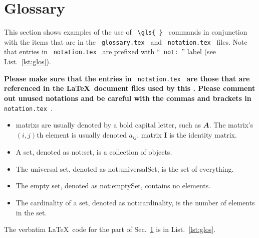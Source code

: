 \newpage
\section{Glossary}
\label{sec:glos}

This section shows examples of the use of \verb| \gls{ } | commands in conjunction with the items that are in the \verb| glossary.tex | and \verb| notation.tex | files.  Note that entries in  \verb| notation.tex |  are prefixed with ``\verb| not: |'' label (see List.~\ref{lst:glos}).

\textbf{Please make sure that the entries in} \verb| notation.tex |\textbf{  are those that are referenced in the \LaTeX \ document files used by this \documentType.  Please comment out unused notations and be careful with the commas and brackets  in} \verb| notation.tex |.

\begin{itemize}

	\item \Glspl{matrix} are usually denoted by a bold capital letter, such as $\mathbfit{A}$. The \gls{matrix}'s $(i,j)$th element is usually denoted $a_{ij}$. \Gls{matrix} $\mathbf{I}$ is the identity \gls{matrix}.

	\item A set, denoted as \gls{not:set}, is a collection of objects.

	\item The universal set,  denoted as \gls{not:universalSet}, is the set of everything.

	\item The empty set, denoted as \gls{not:emptySet}, contains no elements.

	\item The cardinality of a set, denoted as \gls{not:cardinality}, is the number of elements in the set.

\end{itemize}


The verbatim \LaTeX \ code for the part of Sec.~\ref{sec:glos} is in List.~\ref{lst:glos}.

